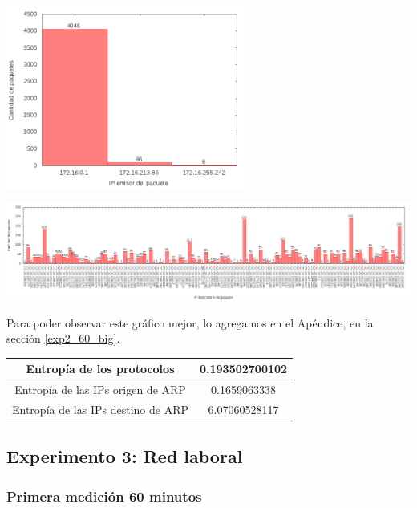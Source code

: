 \begin{center}
\includegraphics[width=8cm]{../mediciones/altop-wifi-60/altop60IpsSrcArp.png}
\end{center}

\begin{center}
\includegraphics[width=16cm]{../mediciones/altop-wifi-60/altop60IpsDstArp.png}
\end{center}

Para poder observar este gráfico mejor, lo agregamos en el Apéndice, en la sección \ref{exp2_60_big}.


\begin{center}
\begin{tabular}{|c||c|}
\hline
Entropía de los protocolos & 0.193502700102 \\
\hline
Entropía de las IPs origen de ARP & 0.1659063338  \\
\hline
Entropía de las IPs destino de ARP & 6.07060528117 \\
\hline
\end{tabular}
\end{center}


\subsection{Experimento 3: Red laboral}
\subsubsection{Primera medición 60 minutos}

